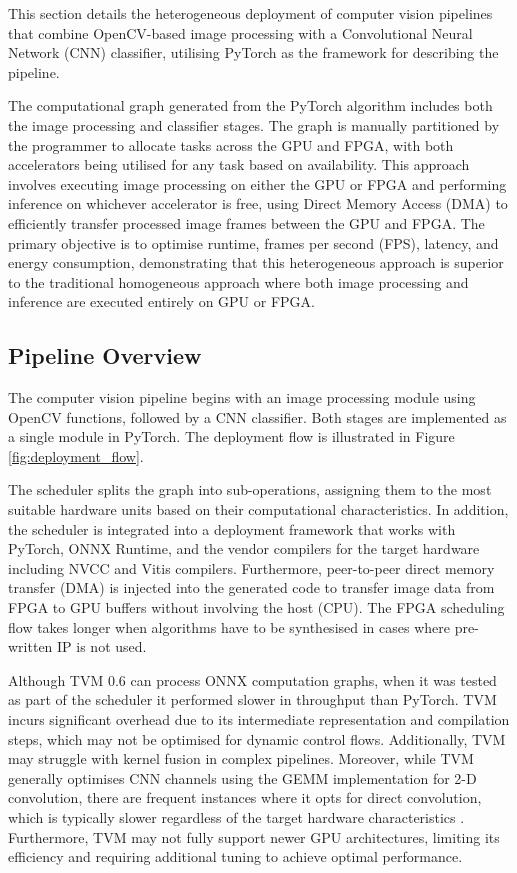 \documentclass[]{spie}  %
\begin{document}
This section details the heterogeneous deployment of computer vision pipelines that combine OpenCV-based image processing with a Convolutional Neural Network (CNN) classifier, utilising PyTorch as the framework for describing the pipeline. 

The computational graph generated from the PyTorch algorithm includes both the image processing and classifier stages. The graph is manually partitioned by the programmer to allocate tasks across the GPU and FPGA, with both accelerators being utilised for any task based on availability. This approach involves executing image processing on either the GPU or FPGA and performing inference on whichever accelerator is free, using Direct Memory Access (DMA) to efficiently transfer processed image frames between the GPU and FPGA. The primary objective is to optimise runtime, frames per second (FPS), latency, and energy consumption, demonstrating that this heterogeneous approach is superior to the traditional homogeneous approach where both image processing and inference are executed entirely on GPU or FPGA.

\subsection{Pipeline Overview}

The computer vision pipeline begins with an image processing module using OpenCV functions, followed by a CNN classifier. Both stages are implemented as a single module in PyTorch. The deployment flow is illustrated in Figure \ref{fig:deployment_flow}.

The scheduler splits the graph into sub-operations, assigning them to the most suitable hardware units based on their computational characteristics. In addition, the scheduler is integrated into a deployment framework that works with PyTorch, ONNX Runtime, and the vendor compilers for the target hardware including NVCC and Vitis compilers. Furthermore, peer-to-peer direct memory transfer (DMA) is injected into the generated code to transfer image data from FPGA to GPU buffers without involving the host (CPU). The FPGA scheduling flow takes longer when algorithms have to be synthesised in cases where pre-written IP is not used.

Although TVM 0.6 can process ONNX computation graphs, when it was tested as part of the scheduler it performed slower in throughput than PyTorch. TVM incurs significant overhead due to its intermediate representation and compilation steps, which may not be optimised for dynamic control flows. Additionally, TVM may struggle with kernel fusion in complex pipelines. Moreover, while TVM generally optimises CNN channels using the GEMM implementation for 2-D convolution, there are frequent instances where it opts for direct convolution, which is typically slower regardless of the target hardware characteristics \cite{9042000}. Furthermore, TVM may not fully support newer GPU architectures, limiting its efficiency and requiring additional tuning to achieve optimal performance.
\end{document}
